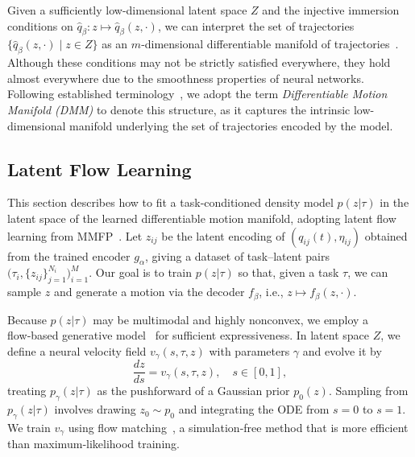 Given a sufficiently low-dimensional latent space $Z$ and the injective immersion conditions on $\hat{q}_{\beta}\colon z \mapsto \hat{q}_{\beta}(z, \cdot)$, we can interpret the set of trajectories $\{\hat{q}_{\beta}(z, \cdot) \mid z \in Z\}$ as an $m$-dimensional differentiable manifold of trajectories~\cite{arvanitidis2017latent,lee2023geometric,lee2022statistical,lee2024mmp++,yonghyeon2022regularized,heo2025isometric}.  
Although these conditions may not be strictly satisfied everywhere, they hold almost everywhere due to the smoothness properties of neural networks.  
Following established terminology~\cite{lee2023equivariant,lee2024mmp++,lee2025motion}, we adopt the term \emph{Differentiable Motion Manifold (DMM)} to denote this structure, as it captures the intrinsic low-dimensional manifold underlying the set of trajectories encoded by the model.





\subsection{Latent Flow Learning}
\label{sec:C}
This section describes how to fit a task‑conditioned density model $p(z|\tau)$ in the latent space of the learned differentiable motion manifold, adopting latent flow learning from MMFP~\cite{lee2025motion}.  
Let $z_{ij}$ be the latent encoding of $(q_{ij}(t),\eta_{ij})$ obtained from the trained encoder $g_{\alpha}$, giving a dataset of task–latent pairs $\big(\tau_i,\{z_{ij}\}_{j=1}^{N_i}\big)_{i=1}^M$.
Our goal is to train $p(z|\tau)$ so that, given a task $\tau$, we can sample $z$ and generate a motion via the decoder $f_\beta$, i.e., $z \mapsto f_\beta(z,\cdot)$.

Because $p(z|\tau)$ may be multimodal and highly nonconvex, we employ a flow‑based generative model~\cite{chen2018neural,lipman2022flow} for sufficient expressiveness.  
In latent space $Z$, we define a neural velocity field $v_\gamma(s,\tau,z)$ with parameters $\gamma$ and evolve it by
\begin{equation}
\label{eq:lsode}
    \frac{dz}{ds} = v_\gamma(s,\tau,z), \quad s \in [0,1],
\end{equation}
treating $p_\gamma(z|\tau)$ as the pushforward of a Gaussian prior $p_0(z)$.  
Sampling from $p_\gamma(z|\tau)$ involves drawing $z_0\sim p_0$ and integrating the ODE from $s=0$ to $s=1$.  
We train $v_\gamma$ using flow matching~\cite{lipman2022flow}, a simulation‑free method that is more efficient than maximum‑likelihood training.

